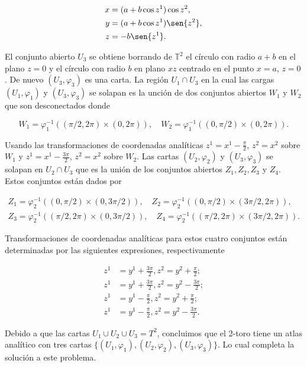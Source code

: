 \documentclass[a4paper,10pt]{article}
\numberwithin{equation}{section}
\begin{document}
\begin{align}
 x &= (a+b \cos{z^1})\cos{z^2}, \\
 y &= (a+b \cos{z^1})\sen{z^2}, \\
 z &= - b \sen{z^1}.
\end{align}

El conjunto abierto $U_3$ se obtiene borrando de $\mathbb{T}^2$ el círculo con 
radio $a+b$ en el plano $z=0$ y el círculo con radio $b$ en plano $xz$ centrado 
en el punto $x=a$, $z=0$. De nuevo $(U_3,\varphi_3)$ es una carta. La región 
$U_1 \cap U_3$ en la cual las cargas $(U_1,\varphi_1)$ y $(U_3,\varphi_3)$ 
se solapan es la unción de dos conjuntos abiertos $W_1$ y $W_2$ que son 
desconectados donde 

\begin{equation}
  W_1 = \varphi_1^{-1}((\pi/2,2\pi) \times (0,2\pi)), \quad 
 W_2 =  \varphi_1^{-1}((0,\pi/2) \times (0,2\pi)).
\end{equation}

Usando las transformaciones de coordenadas analíticas $z^1 = x^1 - \frac{\pi}{2}$, 
$z^2 = x^2$ sobre $W_1$ y $z^1 = x^1 - \frac{3\pi}{2}$, $z^2 = x^2$ sobre $W_2$. 
Las cartas $(U_2,\varphi_2)$ y $(U_3,\varphi_3)$ se solapan en $U_2 \cap U_3$ que 
es la unión de los conjuntos abiertos $Z_1, Z_2, Z_3$ y $Z_4$. Estos conjuntos 
están dados por 

\begin{align}
 Z_1 = \varphi_2^{-1}((0,\pi/2) \times (0,3\pi/2)), \quad 
 Z_2 = \varphi_2^{-1}((0,\pi/2) \times (3\pi/2,2\pi)), \\
 Z_3 = \varphi_2^{-1}((\pi/2,2\pi) \times (0,3\pi/2)), \quad 
 Z_4 = \varphi_2^{-1}((\pi/2,2\pi) \times (3\pi/2,2\pi)).
\end{align}

Transformaciones de coordenadas analíticas para estos cuatro conjuntos están determinadas 
por las siguientes expresiones, respectivamente 

\begin{align}
 z^1 &= y^1 + \frac{3\pi}{2}, z^2 = y^2 + \frac{\pi}{2}; \\
 z^1 &= y^1 + \frac{3\pi}{2}, z^2 = y^2 - \frac{3\pi}{2}; \\
 z^1 &= y^1 - \frac{\pi}{2}, z^2 = y^2 + \frac{\pi}{2}; \\
 z^1 &= y^1 - \frac{\pi}{2}, z^2 = y^2 - \frac{3\pi}{2}.
\end{align}

Debido a que las cartas $U_1 \cup U_2 \cup U_3 = T^2$, concluimos que el 2-toro 
tiene un atlas analítico con tres cartas $\{(U_1,\varphi_1),(U_2,\varphi_2),(U_3,\varphi_3)\}$. 
Lo cual completa la solución a este problema.
\end{document}
